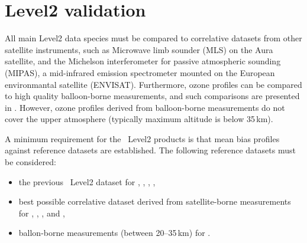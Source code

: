 \section{Level2 validation}

All main Level2 data species must be compared to correlative datasets
from other satellite instruments, such as Microwave limb sounder (MLS)
on the Aura satellite, and the Michelson interferometer for passive
atmospheric sounding (MIPAS), a mid-infrared emission spectrometer
mounted on the European environmantal satellite (ENVISAT).
Furthermore, \smr ozone profiles can be compared to high quality balloon-borne 
measurements, and such comparisons are presented in \citep{jegou:techn:08}.
However, ozone profiles derived from balloon-borne 
measurements do not cover the upper atmosphere (typically maximum
altitude is below 35\,km).

A minimum requirement for the \smr\ Level2 products is that mean bias
profiles against reference datasets are established. 
The following reference datasets must be considered:
\begin{itemize}

\item the previous \smr\ Level2 dataset for , , , ,

\item best possible correlative dataset derived from satellite-borne measurements
      for , , , and ,

\item ballon-borne measurements (between 20--35\,km) for .

\end{itemize}



 
